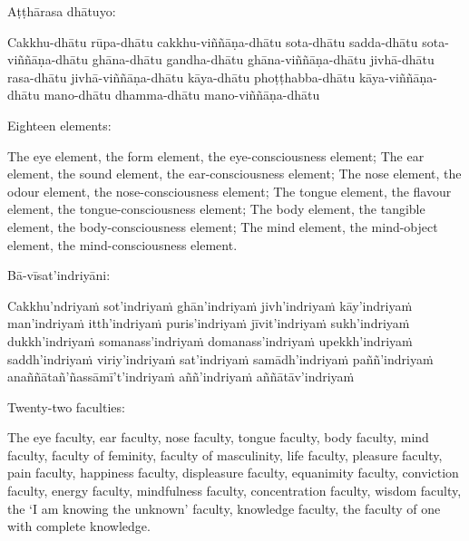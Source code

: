 \suttaRef{[MN 148]}

\begin{pali-hang-continued}
  Aṭṭhārasa dhātuyo:
  \begin{pali-hang}
    Cakkhu-dhātu rūpa-dhātu cakkhu-viññāṇa-dhātu sota-dhātu sadda-dhātu sota-viññāṇa-dhātu ghāna-dhātu gandha-dhātu ghāna-viññāṇa-dhātu jivhā-dhātu rasa-dhātu jivhā-viññāṇa-dhātu kāya-dhātu phoṭṭhabba-dhātu kāya-viññāṇa-dhātu mano-dhātu dhamma-dhātu mano-viññāṇa-dhātu
  \end{pali-hang}
\end{pali-hang-continued}

\begin{english-verses}
  Eighteen elements:
  \begin{english-hangtogether-verses}
    The eye element, the form element, the eye-consciousness element; The ear element, the sound element, the ear-consciousness element; The nose element, the odour element, the nose-consciousness element; The tongue element, the flavour element, the tongue-consciousness element; The body element, the tangible element, the body-consciousness element; The mind element, the mind-object element, the mind-consciousness element.
  \end{english-hangtogether-verses}
\end{english-verses}

\suttaRef{[MN 115]}

\begin{pali-hang-continued}
  Bā-vīsat'indriyāni:\makeatletter\hyperlink{endnote131-appendix}\makeatother
  \begin{pali-hang}
    Cakkhu'ndriyaṁ sot'indriyaṁ ghān'indriyaṁ jivh'indriyaṁ kāy'indriyaṁ man'indriyaṁ itth'indriyaṁ puris'indriyaṁ jīvit'indriyaṁ sukh'indriyaṁ dukkh'indriyaṁ somanass'indriyaṁ domanass'indriyaṁ upekkh'indriyaṁ saddh'indriyaṁ viriy'indriyaṁ sat'indriyaṁ samādh'indriyaṁ paññ'indriyaṁ anaññātañ'ñassāmī't'indriyaṁ aññ'indriyaṁ aññātāv'indriyaṁ
  \end{pali-hang}
\end{pali-hang-continued}

\begin{english-verses}
  Twenty-two faculties:
  \begin{english-hangtogether-verses}
    The eye faculty, ear faculty, nose faculty, tongue faculty, body faculty, mind faculty, faculty of feminity, faculty of masculinity, life faculty, pleasure faculty, pain faculty, happiness faculty, displeasure faculty, equanimity faculty, conviction faculty, energy faculty, mindfulness faculty, concentration faculty, wisdom faculty, the `I am knowing the unknown' faculty, knowledge faculty, the faculty of one with complete knowledge.
  \end{english-hangtogether-verses}
\end{english-verses}

